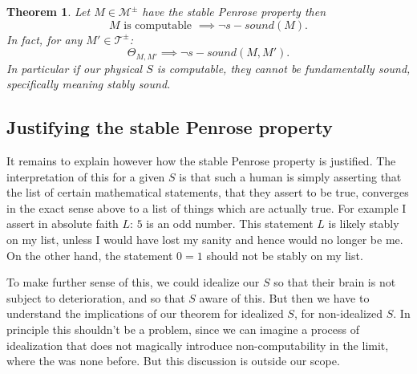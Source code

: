 \documentclass{amsart}  %
\numberwithin{equation}{section}
\newtheorem{theorem}[equation]{Theorem}
\theoremstyle{definition}
\theoremstyle{remark}
\begin{document}
{\begin{theorem} \label{thm:2} Let $M \in \mathcal{M} ^{\pm} $ have the stable Penrose property then 
\begin{equation*}
M \text{ is computable } \implies \neg s-sound ({M}). 
\end{equation*}
In fact, for any $ {M'} \in \mathcal{T} ^{\pm} $:
\begin{equation*}
   \Theta _{ {M}, {M'}} \implies   \neg s-sound ( {M}, {M'} ).
\end{equation*}
In particular if our physical $S$ is computable, they cannot be fundamentally sound,  specifically meaning stably sound.
\end{theorem} 
\subsection {Justifying the stable Penrose property} \label{section:justify}
It remains to explain however how the stable Penrose property is justified. The interpretation of this for a given $S$ is that such a human is simply asserting that the list of certain mathematical statements, that they assert to be true, converges in the exact sense above to a list of things which are actually true.  For example I assert in absolute faith $L$: $5$ is an odd number. This statement $L$ is likely stably on my list, unless I would have lost my sanity and hence would no longer be me. On the other hand, the statement $0=1$ should not be stably on my list. 


To make further sense of this, we could idealize our $S$ so that their brain is not subject to deterioration, and so that $S$ aware of this. But then we have to understand the implications of our theorem for idealized $S$, for non-idealized $S$. In principle this shouldn't be a problem, since we can imagine a process of idealization that does not magically introduce non-computability in the limit, where the was none before.  But this discussion is outside our scope.

}
\end{document}
